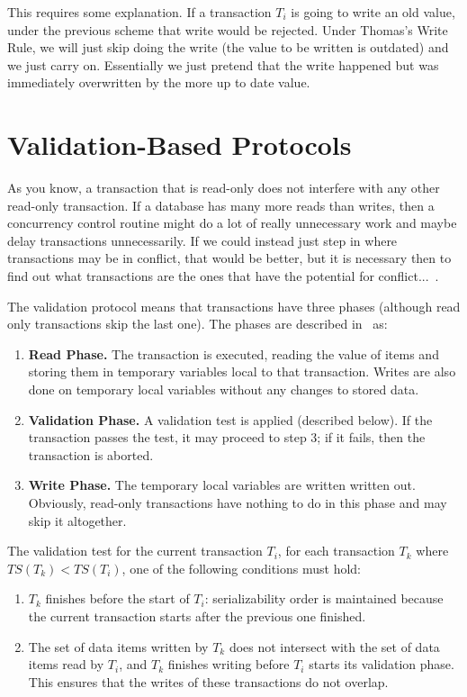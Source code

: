 This requires some explanation. If a transaction $T_{i}$ is going to write an old value, under the previous scheme that write would be rejected. Under Thomas's Write Rule, we will just skip doing the write (the value to be written is outdated) and we just carry on. Essentially we just pretend that the write happened but was immediately overwritten by the more up to date value. 

\section*{Validation-Based Protocols}

As you know, a transaction that is read-only does not interfere with any other read-only transaction. If a database has many more reads than writes, then a concurrency control routine might do a lot of really unnecessary work and maybe delay transactions unnecessarily. If we could instead just step in where transactions may be in conflict, that would be better, but it is necessary then to find out what transactions are the ones that have the potential for conflict...~\cite{dsc}.

The validation protocol means that transactions have three phases (although read only transactions skip the last one). The phases are described in~\cite{dsc} as:

\begin{enumerate}
	\item \textbf{Read Phase.} The transaction is executed, reading the value of items and storing them in temporary variables local to that transaction. Writes are also done on temporary local variables without any changes to stored data.
	\item \textbf{Validation Phase.} A validation test is applied (described below). If the transaction passes the test, it may proceed to step 3; if it fails, then the transaction is aborted.
	\item \textbf{Write Phase.} The temporary local variables are written written out. Obviously, read-only transactions have nothing to do in this phase and may skip it altogether.
	
\end{enumerate}

The validation test for the current transaction $T_{i}$, for each transaction $T_{k}$ where $T\!S(T_{k}) < T\!S(T_{i})$, one of the following conditions must hold:

\begin{enumerate}
	\item $T_{k}$ finishes before the start of $T_{i}$: serializability order is maintained because the current transaction starts after the previous one finished.
	\item The set of data items written by $T_{k}$ does not intersect with the set of data items read by $T_{i}$, and $T_{k}$ finishes writing before $T_{i}$ starts its validation phase. This ensures that the writes of these transactions do not overlap.
\end{enumerate} 

